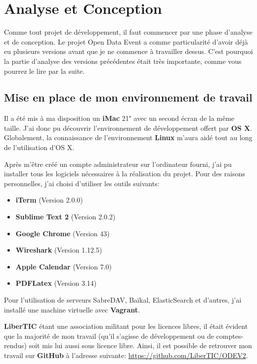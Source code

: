 \section{Analyse et Conception}

Comme tout projet de développement, il faut commencer par une phase d'analyse et de conception. Le projet Open Data Event a comme particularité d'avoir déjà eu plusieurs versions avant que je ne commence à travailler dessus. C'est pourquoi la partie d'analyse des versions précédentes était très importante, comme vous pourrez le lire par la suite.

\subsection{Mise en place de mon environnement de travail}

Il a été mis à ma disposition un \textbf{iMac} 21" avec un second écran de la même taille. J'ai donc pu découvrir l'environnement de développement offert par \textbf{OS X}. Globalement, la connaissance de l'environnement \textbf{Linux} m'aura aidé tout au long de l'utilisation d'OS X.

Après m'être créé un compte administrateur sur l'ordinateur fourni, j'ai pu installer tous les logiciels nécessaires à la réalisation du projet. Pour des raisons personnelles, j'ai choisi d'utiliser les outils suivants:

\begin{itemize}
    \item \textbf{iTerm} (Version 2.0.0)
    \item \textbf{Sublime Text 2} (Version 2.0.2)
    \item \textbf{Google Chrome} (Version 43)
    \item \textbf{Wireshark} (Version 1.12.5)
    \item \textbf{Apple Calendar} (Version 7.0)
    \item \textbf{PDFLatex} (Version 3.14)
\end{itemize}

Pour l'utilisation de serveurs SabreDAV, Baïkal, ElasticSearch et d'autres, j'ai installé une machine virtuelle avec \textbf{Vagrant}.

\textbf{LiberTIC} étant une association militant pour les licences libres, il était évident que la majorité de mon travail (qu'il s'agisse de développement ou de comptes-rendus) soit mis lui aussi sous licence libre. Ainsi, il est possible de retrouver mon travail sur \textbf{GitHub} à l'adresse suivante: \url{https://github.com/LiberTIC/ODEV2}.

